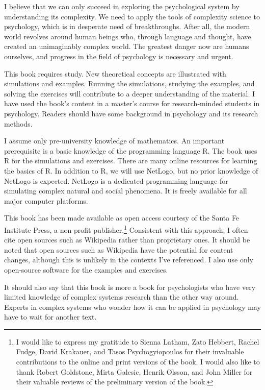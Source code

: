 \documentclass[
  a4paper,
  DIV=11,
  numbers=noendperiod,
  oneside]{scrreprt}
\begin{document}
I believe that we can only succeed in exploring the psychological system
by understanding its complexity. We need to apply the tools of
complexity science to psychology, which is in desperate need of
breakthroughs. After all, the modern world revolves around human beings
who, through language and thought, have created an unimaginably complex
world. The greatest danger now are humans ourselves, and progress in the
field of psychology is necessary and urgent.

This book requires study. New theoretical concepts are illustrated with
simulations and examples. Running the simulations, studying the
examples, and solving the exercises will contribute to a deeper
understanding of the material. I have used the book's content in a
master's course for research-minded students in psychology. Readers
should have some background in psychology and its research methods.

I assume only pre-university knowledge of mathematics. An important
prerequisite is a basic knowledge of the programming language R. The
book uses R for the simulations and exercises. There are many online
resources for learning the basics of R. In addition to R, we will use
NetLogo, but no prior knowledge of NetLogo is expected. NetLogo is a
dedicated programming language for simulating complex natural and social
phenomena. It is freely available for all major computer platforms.

This book has been made available as open access courtesy of the Santa
Fe Institute Press, a non-profit publisher.\footnote{I would like to
  express my gratitude to Sienna Latham, Zato Hebbert, Rachel Fudge,
  David Krakauer, and Tasos Psychogyiopoulos for their invaluable
  contributions to the online and print versions of the book. I would
  also like to thank Robert Goldstone, Mirta Galesic, Henrik Olsson, and
  John Miller for their valuable reviews of the preliminary version of
  the book.} Consistent with this approach, I often cite open sources
such as Wikipedia rather than proprietary ones. It should be noted that
open sources such as Wikipedia have the potential for content changes,
although this is unlikely in the contexts I've referenced. I also use
only open-source software for the examples and exercises.

It should also say that this book is more a book for psychologists who
have very limited knowledge of complex systems research than the other
way around. Experts in complex systems who wonder how it can be applied
in psychology may have to wait for another text.
\end{document}
